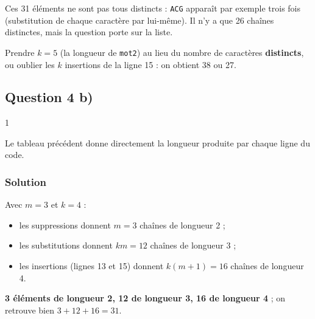 \documentclass[11pt,a4paper]{article}
\providecommand{\tightlist}{\setlength{\itemsep}{0pt}\setlength{\parskip}{0pt}}
\newcommand{\equationajustee}[1]{%
  \sbox{\boiteequation}{$\displaystyle #1$}%
  \ifdim\wd\boiteequation>\linewidth
    \[\resizebox{\linewidth}{!}{\usebox{\boiteequation}}\]%
  \else
    \[#1\]%
  \fi}
\begin{document}
\equationajustee{\begin{aligned}
|\texttt{Dict[1]}| &= N(3)\\
&= 9\times 3+4
\end{aligned}}

\equationajustee{\boxed{|\texttt{Dict[1]}| = 31}}

Ces 31 éléments ne sont pas tous distincts : \texttt{\textquotesingle{}ACG\textquotesingle{}} apparaît par exemple trois fois (substitution de chaque caractère par lui-même). Il n'y a que 26 chaînes distinctes, mais la question porte sur la liste.

\begin{piege}

Prendre \(k=5\) (la longueur de \texttt{mot2}) au lieu du nombre de caractères \textbf{distincts}, ou oublier les \(k\) insertions de la ligne 15 : on obtient 38 ou 27.

\end{piege}

\hypertarget{question-4-b}{%
\subsection{Question 4 b)}\label{question-4-b}}

\begin{indication}{1}

Le tableau précédent donne directement la longueur produite par chaque ligne du code.

\end{indication}

\hypertarget{solution-5}{%
\subsubsection{Solution}\label{solution-5}}

Avec \(m=3\) et \(k=4\) :

\begin{itemize}
\tightlist
\item
  les suppressions donnent \(m=3\) chaînes de longueur 2 ;
\item
  les substitutions donnent \(km=12\) chaînes de longueur 3 ;
\item
  les insertions (lignes 13 et 15) donnent \(k(m+1)=16\) chaînes de longueur 4.
\end{itemize}

\textbf{3 éléments de longueur 2, 12 de longueur 3, 16 de longueur 4} ; on retrouve bien \(3+12+16=31\).
\end{document}
